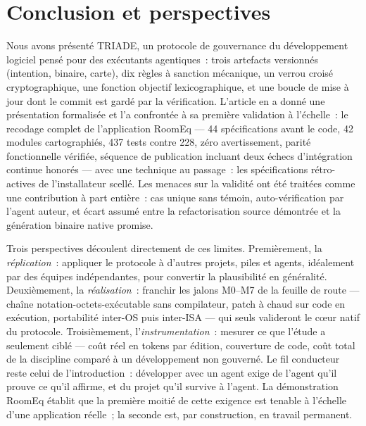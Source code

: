 \section{Conclusion et perspectives}\label{sec:conclusion}

Nous avons présenté TRIADE, un protocole de gouvernance du développement
logiciel pensé pour des exécutants agentiques~: trois artefacts versionnés
(intention, binaire, carte), dix règles à sanction mécanique, un verrou
croisé cryptographique, une fonction objectif lexicographique, et une
boucle de mise à jour dont le commit est gardé par la vérification.
L’article en a donné une présentation formalisée et l’a confrontée à sa
première validation à l’échelle~: le recodage complet de l’application
RoomEq — 44 spécifications avant le code, 42 modules cartographiés, 437
tests contre 228, zéro avertissement, parité fonctionnelle vérifiée,
séquence de publication incluant deux échecs d’intégration continue honorés
— avec une technique au passage~: les spécifications rétro-actives de
l’installateur scellé. Les menaces sur la validité ont été traitées comme
une contribution à part entière~: cas unique sans témoin,
auto-vérification par l’agent auteur, et écart assumé entre la
refactorisation source démontrée et la génération binaire native promise.

Trois perspectives découlent directement de ces limites.
Premièrement, la \emph{réplication}~: appliquer le protocole à d’autres
projets, piles et agents, idéalement par des équipes indépendantes, pour
convertir la plausibilité en généralité. Deuxièmement, la
\emph{réalisation}~: franchir les jalons M0–M7 de la feuille de route —
chaîne notation-octets-exécutable sans compilateur, patch à chaud sur code
en exécution, portabilité inter-OS puis inter-ISA — qui seuls valideront
le cœur natif du protocole. Troisièmement, l’\emph{instrumentation}~:
mesurer ce que l’étude a seulement ciblé — coût réel en tokens par
édition, couverture de code, coût total de la discipline comparé à un
développement non gouverné. Le fil conducteur reste celui de
l’introduction~: développer avec un agent exige de l’agent qu’il prouve
ce qu’il affirme, et du projet qu’il survive à l’agent. La démonstration
RoomEq établit que la première moitié de cette exigence est tenable à
l’échelle d’une application réelle~; la seconde est, par construction, en
travail permanent.
